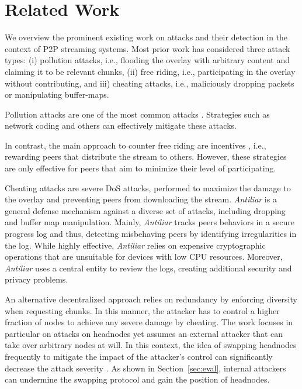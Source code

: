 \section{Related Work}
\label{sec:related}

We overview the prominent existing work on attacks and their detection in the context of P2P streaming systems. Most prior work has considered three attack types: (i) pollution attacks, i.e., flooding the overlay with arbitrary content and claiming it to be relevant chunks, (ii) free riding, i.e., participating in the overlay without contributing, and iii) cheating attacks, i.e., maliciously dropping packets or manipulating buffer-maps. 

Pollution attacks are one of the most common attacks \cite{pollution1}. Strategies such as network coding \cite{nc} and others \cite{pollution2} 
can effectively mitigate these attacks. 

In contrast, the main approach to counter free riding are incentives \cite{defending,defending2}, i.e., rewarding peers that distribute the stream to others. 
However, these strategies are only effective for peers that aim to minimize their level of participating. 

  
Cheating attacks are severe DoS attacks, performed to maximize the damage to the overlay and preventing peers from downloading the stream.   
\textit{Antiliar} is a general defense mechanism against a diverse set of attacks, including dropping and buffer map manipulation\cite{antiliar}.
Mainly, \textit{Antiliar} tracks peers behaviors in a secure progress log and thus, detecting misbehaving peers by identifying irregularities in the log. 
While highly effective, \textit{Antiliar} relies on expensive cryptographic operations that are unsuitable for devices with low CPU resources.
Moreover, \textit{Antiliar} uses a central entity to review the logs, creating additional security and privacy problems. 


An alternative  decentralized approach \cite{nguyen2014resilience} relies on redundancy by enforcing diversity when requesting chunks. 
In this manner, the attacker has to control a higher fraction of nodes to achieve any severe damage by cheating.
The work focuses in particular on attacks on headnodes yet assumes an external attacker that can take over arbitrary nodes at will.
In this context, the idea of swapping headnodes frequently to mitigate the impact of the attacker's control can significantly decrease the attack severity \cite{nguyen2016swap}.
As shown in Section~\ref{sec:eval}, internal attackers can undermine the swapping protocol and gain the position of headnodes.  
